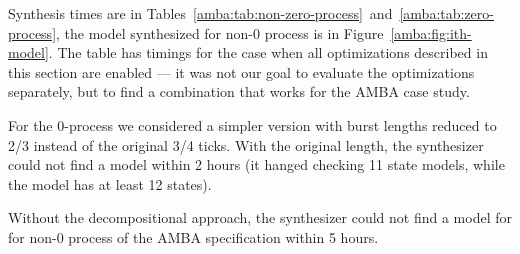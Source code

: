 %
%
%
%



Synthesis times are in Tables~\ref{amba:tab:non-zero-process}~and~\ref{amba:tab:zero-process}, 
the model synthesized for non-0 process is in Figure~\ref{amba:fig:ith-model}.
The table has timings for the case when all optimizations described in this section are enabled --- it was not our goal to evaluate the optimizations separately, but to find a combination that works for the AMBA case study.

For the $0$-process we considered a simpler version with burst lengths reduced to 2/3 instead of the original 3/4 ticks.
With the original length, the synthesizer could not find a model within 2 hours (it hanged checking 11 state models, while the model has at least 12 states).

Without the decompositional approach,
the synthesizer could not find a model for for non-0 process of the AMBA specification within 5 hours.

